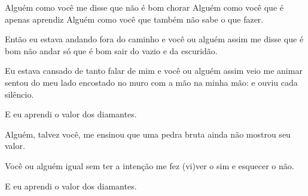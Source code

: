 \begin{poem}
\begin{stanza}
Alguém como você\verseline
me disse que não é bom chorar\verseline
Alguém como você\verseline
que é apenas aprendiz\verseline
Alguém como você\verseline
que também não sabe o que fazer.
\end{stanza}
\begin{stanza}
Então eu estava andando fora do caminho\verseline
e você ou alguém assim me disse\verseline
que é bom não andar só\verseline
que é bom sair do vazio\verseline
e da escuridão.
\end{stanza}
\begin{stanza}
Eu estava cansado de tanto falar de mim\verseline
e você ou alguém assim\verseline
veio me animar\verseline
sentou do meu lado encostado no muro\verseline
com a mão na minha mão:\verseline
e ouviu cada silêncio.
\end{stanza}
\begin{stanza}
E eu aprendi o valor dos diamantes.
\end{stanza}
\begin{stanza}
Alguém, talvez você, me ensinou\verseline
que uma pedra bruta\verseline
ainda não mostrou seu valor.
\end{stanza}
\begin{stanza}
Você ou alguém igual\verseline
sem ter a intenção\verseline
me fez (vi)ver o sim\verseline
e esquecer o não.
\end{stanza}
\begin{stanza}
E eu aprendi o valor dos diamantes.
\end{stanza}
\end{poem}